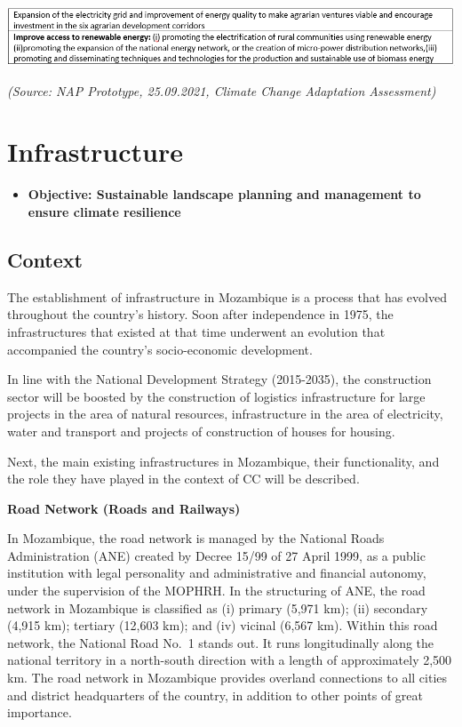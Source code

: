 \documentclass[
]{book}
\providecommand{\tightlist}{%
  \setlength{\itemsep}{0pt}\setlength{\parskip}{0pt}}
\begin{document}
\includegraphics{Figure42.png}

\emph{(Source: NAP Prototype, 25.09.2021, Climate Change Adaptation Assessment)}

\hypertarget{infrastructure}{%
\section{Infrastructure}\label{infrastructure}}

\begin{itemize}
\tightlist
\item
  \textbf{Objective: Sustainable landscape planning and management to ensure climate resilience}
\end{itemize}

\hypertarget{context-6}{%
\subsection{Context}\label{context-6}}

The establishment of infrastructure in Mozambique is a process that has evolved throughout the country's history. Soon after independence in 1975, the infrastructures that existed at that time underwent an evolution that accompanied the country's socio-economic development.

In line with the National Development Strategy (2015-2035), the construction sector will be boosted by the construction of logistics infrastructure for large projects in the area of natural resources, infrastructure in the area of electricity, water and transport and projects of construction of houses for housing.

Next, the main existing infrastructures in Mozambique, their functionality, and the role they have played in the context of CC will be described.

\textbf{Road Network (Roads and Railways)}

In Mozambique, the road network is managed by the National Roads Administration (ANE) created by Decree 15/99 of 27 April 1999, as a public institution with legal personality and administrative and financial autonomy, under the supervision of the MOPHRH. In the structuring of ANE, the road network in Mozambique is classified as (i) primary (5,971 km); (ii) secondary (4,915 km); tertiary (12,603 km); and (iv) vicinal (6,567 km). Within this road network, the National Road No.~1 stands out. It runs longitudinally along the national territory in a north-south direction with a length of approximately 2,500 km. The road network in Mozambique provides overland connections to all cities and district headquarters of the country, in addition to other points of great importance.
\end{document}
